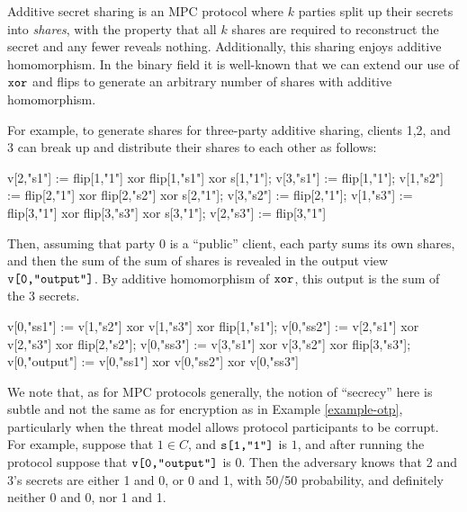 \begin{example}
    \label{example-he}
Additive secret sharing is an MPC protocol where $k$ parties split up
their secrets into \emph{shares}, with the property that all $k$
shares are required to reconstruct the secret and any fewer reveals
nothing. Additionally, this sharing enjoys additive homomorphism. In
the binary field it is well-known that we can extend our use
of $\texttt{xor}$ and flips to generate an arbitrary number of shares
with additive homomorphism. 

For example, to generate shares for three-party additive sharing,
clients 1,2, and 3 can break up and distribute their shares to
each other as follows:
{\small
\begin{verbatimtab}
     v[2,"s1"] := flip[1,"1"] xor flip[1,"s1"] xor s[1,"1"];
     v[3,"s1"] := flip[1,"1"];
     v[1,"s2"] := flip[2,"1"] xor flip[2,"s2"] xor s[2,"1"];
     v[3,"s2"] := flip[2,"1"];
     v[1,"s3"] := flip[3,"1"] xor flip[3,"s3"] xor s[3,"1"];
     v[2,"s3"] := flip[3,"1"] \end{verbatimtab}
}
Then, assuming that party 0 is a ``public'' client, each party sums
its own shares, and then the sum of the sum of shares is revealed
in the output view $\texttt{v[0,"output"]}$. By additive homomorphism of
$\texttt{xor}$, this output is the sum of the 3 secrets.
{\small
\begin{verbatimtab}
     v[0,"ss1"] := v[1,"s2"] xor v[1,"s3"] xor flip[1,"s1"];
     v[0,"ss2"] := v[2,"s1"] xor v[2,"s3"] xor flip[2,"s2"];
     v[0,"ss3"] := v[3,"s1"] xor v[3,"s2"] xor flip[3,"s3"];
     v[0,"output"] := v[0,"ss1"] xor v[0,"ss2"] xor v[0,"ss3"] \end{verbatimtab}
}
We note that, as for MPC protocols generally, the notion of
``secrecy'' here is subtle and not the same as for encryption as in
Example \ref{example-otp}, particularly when the threat model allows
protocol participants to be corrupt. For example, suppose that $1 \in C$, and
$\texttt{s[1,"1"]}$ is $1$, and after running the protocol suppose that
$\texttt{v[0,"output"]}$ is 0. Then the adversary knows that 2 and 3's secrets
are either 1 and 0, or 0 and 1, with 50/50 probability, and definitely
neither 0 and 0, nor 1 and 1. 
\end{example}
